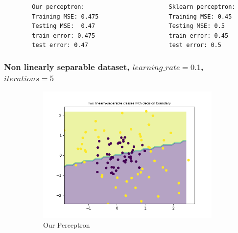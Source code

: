     \begin{verbatim}    
        Our perceptron:                        Sklearn perceptron:
        Training MSE: 0.475                    Training MSE: 0.45
        Testing MSE:  0.47                     Testing MSE: 0.5
        train error: 0.475                     train error: 0.45
        test error: 0.47                       test error: 0.5
    \end{verbatim}

    \subsubsection{Non linearly separable dataset, $learning\_rate=0.1$, $iterations=5$}

    \begin{figure}[ht]
        \centering
        \begin{subfigure}{0.4\textwidth}
            \centering
            \includegraphics[width=\linewidth]{code/plots/our_perceptron_LR0.1_ITER5_dataset_load_non_linearly_separable_data}
            \caption{Our Perceptron}
            \label{fig:image1}
        \end{subfigure}
        \hspace{2cm} %
        \begin{subfigure}{0.4\textwidth}
            \centering

\end{subfigure}
\end{figure}
